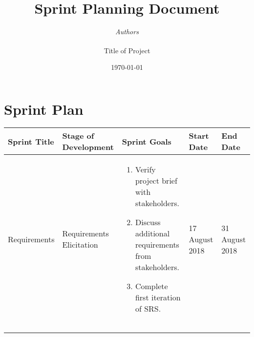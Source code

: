 \documentclass[11pt]{article}
\begin{document}

\thispagestyle{empty}
\title{{\LARGE\bf Sprint Planning Document}}
\author{{\Large\it Authors} \\
\vspace*{2.5in} 
\mbox{} \\
{\Large Title of Project}
\vspace*{2.5in} 
\mbox{} \\
\date{\today}
}
\maketitle


%

\section{Sprint Plan}


	

\begin{table}[H]
	\hskip-2.0cm\begin{tabular}[\textwidth]{@{}|l|l|l|l|l|@{}}
		\toprule
		Sprint Title & Stage of Development & Sprint Goals & Start Date & End Date \\ \midrule
		Requirements & Requirements Elicitation &\begin{minipage}{0.3\textwidth}
		\begin{enumerate}[leftmargin= 0.1\textwidth]
			\item Verify project brief with stakeholders.
			\item Discuss additional requirements from stakeholders.
			\item Complete first iteration of SRS.
		\end{enumerate}
		\end{minipage}& 17 August 2018 & 31 August 2018 \\ \midrule
		&  &  &  &  \\ \midrule
		&  &  &  &  \\ \midrule
		&  &  &  &  \\ \bottomrule
	\end{tabular}
\end{table}
\end{document}

